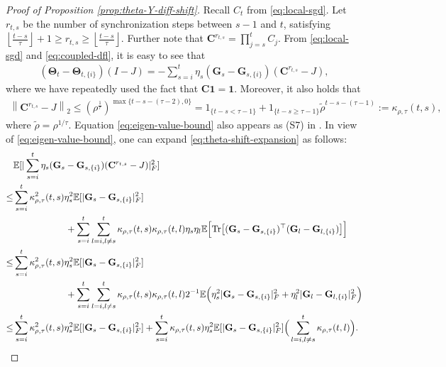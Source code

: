 \documentclass[a4paper,11pt]{article}
\numberwithin{equation}{section}
\theoremstyle{plain}
\theoremstyle{remark}
\def\IE{\mathbb{E}}
\def\bo{\mathbf{1}}
\def\bC{\mathbf{C}}
\def\bG{\mathbf{G}}
\def\bT{\mathbf{\Theta}}
\newcommand{\shift}[2]{#1_{#2, \{i\}}}
\newcommand{\Tr}{\mathrm{Tr}}
\begin{document}
\begin{proof}[Proof of Proposition \ref{prop:theta-Y-diff-shift}]
    Recall $C_t$ from \eqref{eq:local-sgd}. Let $r_{t,s}$ be the number of synchronization steps between $s-1$ and $t$, satisfying $\left\lfloor\frac{t-s}{\tau}\right\rfloor+1 \geq r_{t, s} \geq\left\lfloor\frac{t-s}{\tau}\right\rfloor$. Further note that $\bC^{r_{t,s}}=\prod_{j=s}^t C_j$.  From \eqref{eq:local-sgd} and \eqref{eq:coupled-dfl}, it is easy to see that
    \begin{align} \label{eq:theta-shift-expansion}
        (\bT_t -\shift{\bT}{t})(I-J) = -\sum_{s=i}^t \eta_s (\bG_s - \shift{\bG}{s})(\bC^{r_{t,s}} - J),
    \end{align}
    where we have repeatedly used the fact that $\bC\bo=\bo$. Moreover, it also holds that 
    \begin{align} \label{eq:eigen-value-bound}
        \left\|\bC^{r_{t, s}}-J\right\|_2 \leq\left(\rho^{\frac{1}{\tau}}\right)^{\max \{t-s-(\tau-2), 0\}}=1_{\{t-s<\tau-1\}}+1_{\{t-s \geq \tau-1\}} \tilde{\rho}^{t-s-(\tau-1)} := \kappa_{\rho, \tau}(t,s),
    \end{align}
    where $\tilde{\rho}=\rho^{1/\tau}$. Equation \ref{eq:eigen-value-bound} also appears as (S7) in \cite{songxichen2024}. In view of \eqref{eq:eigen-value-bound}, one can expand \eqref{eq:theta-shift-expansion} as follows:
    \allowdisplaybreaks
    \begin{align}
        &\IE[|\sum_{s=i}^t \eta_s (\bG_s - \shift{\bG}{s})(\bC^{r_{t,s}} - J)|_F^2] \nonumber\\
        \leq & \sum_{s=i}^t  \kappa_{\rho, \tau}^2(t,s)\eta_s^2 \IE[|\bG_s - \shift{\bG}{s}|_F^2] \nonumber\\ &\hspace*{2cm}+ \sum_{s=i}^t \sum_{l=i, l\neq s}^t \kappa_{\rho, \tau}(t,s)\kappa_{\rho, \tau}(t,l)\eta_s\eta_l \IE\Big[\Tr\big[(\bG_s - \shift{\bG}{s})^\top (\bG_l - \shift{\bG}{l})\big]\Big]\label{eq: useful for fourth moemnt}\\
        \leq &\sum_{s=i}^t  \kappa_{\rho, \tau}^2(t,s)\eta_s^2 \IE[|\bG_s - \shift{\bG}{s}|_F^2] \nonumber\\ &\hspace*{2cm}+ \sum_{s=i}^t \sum_{l=i, l\neq s}^t \kappa_{\rho, \tau}(t,s)\kappa_{\rho, \tau}(t,l)2^{-1}\IE\Big(\eta_s^2|\bG_s - \shift{\bG}{s}|_F^2 +  \eta_l^2|\bG_l - \shift{\bG}{l}|_F^2 \Big)\nonumber\\
        \leq & \sum_{s=i}^t  \kappa_{\rho, \tau}^2(t,s)\eta_s^2 \IE[|\bG_s - \shift{\bG}{s}|_F^2] + \sum_{s=i}^t \kappa_{\rho, \tau}(t,s) \eta_s^2\IE[|\bG_s - \shift{\bG}{s}|_F^2 ]\Big(\sum_{l=i, l\neq s}^t \kappa_{\rho, \tau}(t,l)\Big)\label{eq: intermediate-theta-shift-expansion}.

\end{align}
\end{proof}
\end{document}

